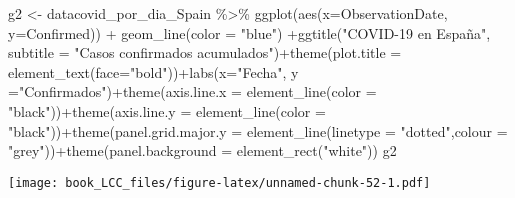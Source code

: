 \documentclass[
]{book}
\newenvironment{Shaded}{\begin{snugshade}}{\end{snugshade}}
\newcommand{\AttributeTok}[1]{\textcolor[rgb]{0.77,0.63,0.00}{#1}}
\newcommand{\FunctionTok}[1]{\textcolor[rgb]{0.00,0.00,0.00}{#1}}
\newcommand{\NormalTok}[1]{#1}
\newcommand{\OtherTok}[1]{\textcolor[rgb]{0.56,0.35,0.01}{#1}}
\newcommand{\SpecialCharTok}[1]{\textcolor[rgb]{0.00,0.00,0.00}{#1}}
\newcommand{\StringTok}[1]{\textcolor[rgb]{0.31,0.60,0.02}{#1}}
\begin{document}
\begin{Shaded}
\begin{Highlighting}[]
\NormalTok{g2 }\OtherTok{\textless{}{-}}\NormalTok{ datacovid\_por\_dia\_Spain }\SpecialCharTok{\%\textgreater{}\%}
    \FunctionTok{ggplot}\NormalTok{(}\FunctionTok{aes}\NormalTok{(}\AttributeTok{x=}\NormalTok{ObservationDate, }\AttributeTok{y=}\NormalTok{Confirmed)) }\SpecialCharTok{+}  \FunctionTok{geom\_line}\NormalTok{(}\AttributeTok{color =} \StringTok{"blue"}\NormalTok{) }\SpecialCharTok{+}\FunctionTok{ggtitle}\NormalTok{(}\StringTok{"COVID{-}19 en España"}\NormalTok{, }\AttributeTok{subtitle =} \StringTok{"Casos confirmados acumulados"}\NormalTok{)}\SpecialCharTok{+}\FunctionTok{theme}\NormalTok{(}\AttributeTok{plot.title =} \FunctionTok{element\_text}\NormalTok{(}\AttributeTok{face=}\StringTok{"bold"}\NormalTok{))}\SpecialCharTok{+}\FunctionTok{labs}\NormalTok{(}\AttributeTok{x=}\StringTok{"Fecha"}\NormalTok{, }\AttributeTok{y =}\StringTok{"Confirmados"}\NormalTok{)}\SpecialCharTok{+}\FunctionTok{theme}\NormalTok{(}\AttributeTok{axis.line.x =} \FunctionTok{element\_line}\NormalTok{(}\AttributeTok{color =} \StringTok{"black"}\NormalTok{))}\SpecialCharTok{+}\FunctionTok{theme}\NormalTok{(}\AttributeTok{axis.line.y =} \FunctionTok{element\_line}\NormalTok{(}\AttributeTok{color =} \StringTok{"black"}\NormalTok{))}\SpecialCharTok{+}\FunctionTok{theme}\NormalTok{(}\AttributeTok{panel.grid.major.y =} \FunctionTok{element\_line}\NormalTok{(}\AttributeTok{linetype =} \StringTok{"dotted"}\NormalTok{,}\AttributeTok{colour =} \StringTok{"grey"}\NormalTok{))}\SpecialCharTok{+}\FunctionTok{theme}\NormalTok{(}\AttributeTok{panel.background =} \FunctionTok{element\_rect}\NormalTok{(}\StringTok{"white"}\NormalTok{))}
\NormalTok{g2}
\end{Highlighting}
\end{Shaded}

\texttt{[image: book\_LCC\_files/figure-latex/unnamed-chunk-52-1.pdf]}
\end{document}
